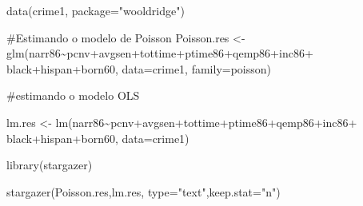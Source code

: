 \documentclass[
  letterpaper,
  DIV=11,
  numbers=noendperiod]{scrreprt}
\newenvironment{Shaded}{\begin{snugshade}}{\end{snugshade}}
\newcommand{\AttributeTok}[1]{\textcolor[rgb]{0.40,0.45,0.13}{#1}}
\newcommand{\CommentTok}[1]{\textcolor[rgb]{0.37,0.37,0.37}{#1}}
\newcommand{\FunctionTok}[1]{\textcolor[rgb]{0.28,0.35,0.67}{#1}}
\newcommand{\NormalTok}[1]{\textcolor[rgb]{0.00,0.23,0.31}{#1}}
\newcommand{\OtherTok}[1]{\textcolor[rgb]{0.00,0.23,0.31}{#1}}
\newcommand{\SpecialCharTok}[1]{\textcolor[rgb]{0.37,0.37,0.37}{#1}}
\newcommand{\StringTok}[1]{\textcolor[rgb]{0.13,0.47,0.30}{#1}}
\begin{document}
\begin{Shaded}
\begin{Highlighting}[]
\FunctionTok{data}\NormalTok{(crime1, }\AttributeTok{package=}\StringTok{"wooldridge"}\NormalTok{)}

\CommentTok{\#Estimando o modelo de Poisson}
\NormalTok{Poisson.res }\OtherTok{\textless{}{-}} \FunctionTok{glm}\NormalTok{(narr86}\SpecialCharTok{\textasciitilde{}}\NormalTok{pcnv}\SpecialCharTok{+}\NormalTok{avgsen}\SpecialCharTok{+}\NormalTok{tottime}\SpecialCharTok{+}\NormalTok{ptime86}\SpecialCharTok{+}\NormalTok{qemp86}\SpecialCharTok{+}\NormalTok{inc86}\SpecialCharTok{+}
\NormalTok{black}\SpecialCharTok{+}\NormalTok{hispan}\SpecialCharTok{+}\NormalTok{born60, }\AttributeTok{data=}\NormalTok{crime1, }\AttributeTok{family=}\NormalTok{poisson)}

\CommentTok{\#estimando o modelo OLS}

\NormalTok{lm.res }\OtherTok{\textless{}{-}} \FunctionTok{lm}\NormalTok{(narr86}\SpecialCharTok{\textasciitilde{}}\NormalTok{pcnv}\SpecialCharTok{+}\NormalTok{avgsen}\SpecialCharTok{+}\NormalTok{tottime}\SpecialCharTok{+}\NormalTok{ptime86}\SpecialCharTok{+}\NormalTok{qemp86}\SpecialCharTok{+}\NormalTok{inc86}\SpecialCharTok{+}
\NormalTok{black}\SpecialCharTok{+}\NormalTok{hispan}\SpecialCharTok{+}\NormalTok{born60, }\AttributeTok{data=}\NormalTok{crime1)}


\FunctionTok{library}\NormalTok{(stargazer)}

\FunctionTok{stargazer}\NormalTok{(Poisson.res,lm.res, }\AttributeTok{type=}\StringTok{"text"}\NormalTok{,}\AttributeTok{keep.stat=}\StringTok{"n"}\NormalTok{)}
\end{Highlighting}
\end{Shaded}
\end{document}
